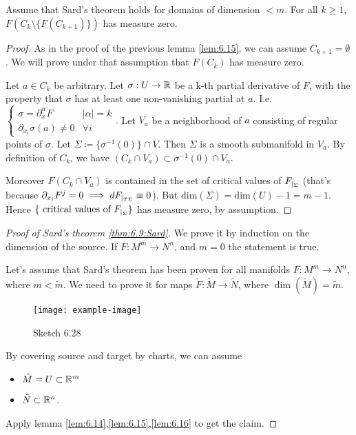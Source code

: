\begin{lemma}\label{lem:6.16}
    Assume that Sard's theorem holds for domains of dimension \(<m\). For all \(k\geq 1\),
    \(F(C_k\setminus\{F(C_{k+1})\})\) has measure zero.         
\end{lemma}

\begin{proof}
    As in the proof of the previous lemma \ref{lem:6.15}, we can assume \(C_{k+1}=\emptyset\). We will prove 
    under that assumption that \(F(C_k)\) has measure zero.

    Let \(a\in C_k\) be arbitrary. Let \(\sigma:U\to \mathbb{R}\) be a k-th partial derivative of \(F\), with the property that 
    \(\sigma\) has at least one non-vanishing partial at \(a\). I.e. \(\begin{cases}
        \sigma =\partial_x^\alpha F & |\alpha|=k\\
        \partial_{x_i}\sigma(a)\neq 0 &\forall i
    \end{cases}.\) Let \(V_a\) be a neighborhood of \(a\) consisting of regular points of \(\sigma\). Let \(\Sigma\coloneqq \{\sigma^{-1}(0)\}\cap V\). Then \(\Sigma\) is a smooth submanifold in \(V_a\).
    By definition of \(C_k\), we have \((C_k\cap V_a)\subset \sigma^{-1}(0)\cap V_a\).
    
    Moreover \(F(C_k\cap V_a)\) is contained in the set of critical values of \(F_{|_{\Sigma}}\) (that's because \(\partial_{x_i}F^j=0\implies dF_{|_{T\Sigma}}\equiv 0\)).
    But \(\text{dim}(\Sigma)=\text{dim}(U)-1=m-1\). Hence \(\{\text{ critical values of } F_{|_{\Sigma}}\}\) has measure zero, by assumption.
\end{proof}

\begin{proof}[Proof of Sard's theorem \ref{thm:6.9:Sard}]
    We prove it by induction on the dimension of the source. If \(F:M^m\to N^n\), and \(m=0\) the statement is true.

    Let's assume that Sard's theorem has been proven for all manifolds \(F:M^m\to N^n\), where \(m<\tilde{m}\).
    We need to prove it for maps \(\tilde{F}:\tilde{M}\to\tilde{N}\), where \(\dim(\tilde{M})=\tilde{m}\).
    \begin{figure}[H]\label{fig:6.28}
        \centering
        \texttt{[image: example-image]}
        \caption{Sketch 6.28}
    \end{figure}
    By covering source and target by charts, we can assume 
    \begin{itemize} %
        \item \(\tilde{M}=U\subset\mathbb{R}^m\)
        \item \(\tilde{N}\subset\mathbb{R}^n\).
    \end{itemize}

    Apply lemma \ref{lem:6.14},\ref{lem:6.15},\ref{lem:6.16} to get the claim. \qedhere

\end{proof}

